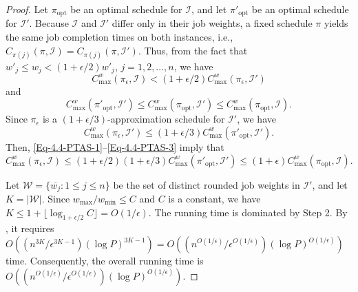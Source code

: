﻿\documentclass[12pt]{article} \textheight=24.5cm \textwidth=16.5cm \parskip = 0.165cm
\begin{document}
\begin{sloppypar}
        \begin{proof}
        Let $\pi_{\mathrm{opt}}$ be an optimal schedule for $\mathcal{I}$, and let $\pi'_{\mathrm{opt}}$ be an optimal schedule for $\mathcal{I}'$.
        Because $\mathcal{I}$ and $\mathcal{I}'$ differ only in their job weights, a fixed schedule $\pi$ yields the same job completion times on both instances, i.e., $C_{\pi(j)}(\pi,\mathcal{I})=C_{\pi(j)}(\pi, \mathcal{I}')$.
        Thus, from the fact that $w'_j \leq w_j < (1+\epsilon/2) w'_j$, $j=1, 2, \ldots, n$, we have
            \begin{equation} \label{Eq-4.4-PTAS-1}
                C_{\max}^w(\pi_{\epsilon}, \mathcal{I}) < (1+\epsilon/2)C_{\max}^w(\pi_{\epsilon}, \mathcal{I}')
            \end{equation}
        and
            \begin{equation} \label{Eq-4.4-PTAS-2}
                C_{\max}^w(\pi'_{\mathrm{opt}}, \mathcal{I}') \leq C_{\max}^w(\pi_{\mathrm{opt}}, \mathcal{I}') \leq C_{\max}^w(\pi_{\mathrm{opt}}, \mathcal{I}).
            \end{equation}
        Since $\pi_{\epsilon}$ is a $(1+\epsilon/3)$-approximation schedule for $\mathcal{I}'$, we have
            \begin{equation} \label{Eq-4.4-PTAS-3}
                C_{\max}^w(\pi_{\epsilon}, \mathcal{I}') \leq (1+\epsilon/3) C_{\max}^w(\pi'_{\mathrm{opt}}, \mathcal{I}').
            \end{equation}
        Then, \cref{Eq-4.4-PTAS-1}--\cref{Eq-4.4-PTAS-3} imply that
            \begin{equation*}
                C_{\max}^w(\pi_{\epsilon}, \mathcal{I}) \leq (1+\epsilon/2) (1+\epsilon/3) C_{\max}^w(\pi'_{\mathrm{opt}}, \mathcal{I}')  \leq  (1+\epsilon)C_{\max}^w(\pi_{\mathrm{opt}},\mathcal{I}).
            \end{equation*}

        Let $\mathcal{W}=\{\overline{w_j}: 1 \leq j \leq n\}$ be the set of distinct rounded job weights in $\mathcal{I}'$, and let $K=|\mathcal{W}|$.
        Since $w_{\max}/w_{\min} \leq C$ and $C$ is a constant, we have $K \leq 1+ \lfloor \log_{1+\epsilon/2} C \rfloor =O(1/\epsilon)$.
        The running time is dominated by Step 2.
        By , it requires $O((n^{3K}/\epsilon^{3K-1}) (\log P)^{3K-1})=O((n^{O(1/\epsilon)}/\epsilon^{O(1/\epsilon)}) (\log P)^{O(1/\epsilon)})$ time.
        Consequently, the overall running time is $O((n^{O(1/\epsilon)}/\epsilon^{O(1/\epsilon)}) (\log P)^{O(1/\epsilon)})$.
        \end{proof}




\end{sloppypar}
\end{document}

